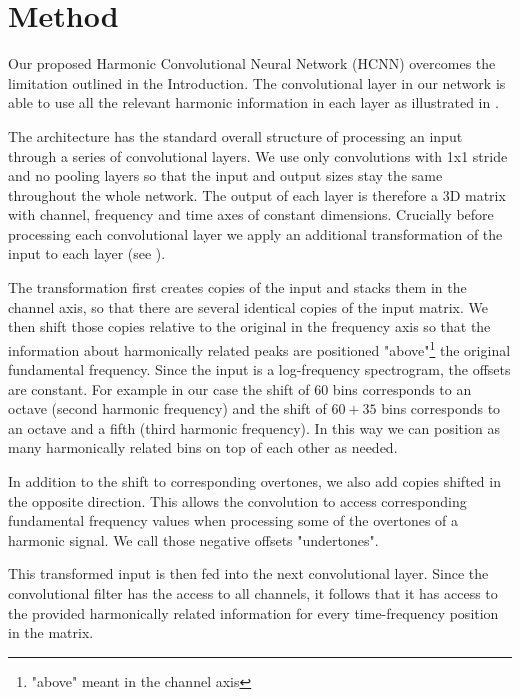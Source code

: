 \documentclass{article}
\begin{document}
\section{Method}\label{sec:method}

Our proposed Harmonic Convolutional Neural Network (HCNN) overcomes the limitation outlined in the Introduction. The convolutional layer in our network is able to use all the relevant harmonic information in each layer as illustrated in . 

The architecture has the standard overall structure of processing an input through a series of convolutional layers. We use only convolutions with 1x1 stride and no pooling layers so that the input and output sizes stay the same throughout the whole network. The output of each layer is therefore a 3D matrix with channel, frequency and time axes of constant dimensions. Crucially before processing each convolutional layer we apply an additional transformation of the input to each layer (see ). 

The transformation first creates copies of the input and stacks them in the channel axis, so that there are several identical copies of the input matrix. We then shift those copies relative to the original in the frequency axis so that the information about harmonically related peaks are positioned "above"\footnote{"above" meant in the channel axis} the original fundamental frequency. Since the input is a log-frequency spectrogram, the offsets are constant. For example in our case the shift of $60$ bins corresponds to an octave (second harmonic frequency) and the shift of $60+35$ bins corresponds to an octave and a fifth (third harmonic frequency). In this way we can position as many harmonically related bins on top of each other as needed. 

In addition to the shift to corresponding overtones, we also add copies shifted in the opposite direction. This allows the convolution to access corresponding fundamental frequency values when processing some of the overtones of a harmonic signal. We call those negative offsets "undertones".

This transformed input is then fed into the next convolutional layer. Since the convolutional filter has the access to all channels, it follows that it has access to the provided harmonically related information for every time-frequency position in the matrix.
\end{document}
